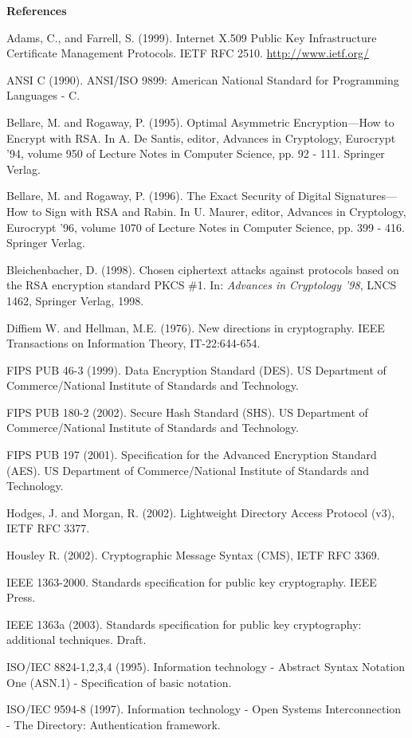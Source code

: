 \documentclass{article}
\begin{document}
\newpage
\noindent
{\Large\bf References}

Adams, C., and Farrell, S. (1999).
Internet X.509 Public Key Infrastructure
Certificate Management Protocols. IETF RFC 2510.
\url{http://www.ietf.org/}

ANSI C	(1990).  ANSI/ISO 9899: American National Standard for 
Programming Languages - C.

Bellare, M. and Rogaway, P. (1995). Optimal Asymmetric Encryption---How 
to Encrypt with RSA. In A. De Santis, editor, Advances in Cryptology, 
Eurocrypt '94, volume 950 of Lecture Notes in Computer Science, 
pp. 92 - 111. Springer Verlag.

Bellare, M. and Rogaway, P. (1996). The Exact Security of Digital 
Signatures---How to Sign with RSA and Rabin. In U. Maurer, editor, 
Advances in Cryptology,
Eurocrypt '96, volume 1070 of Lecture Notes in Computer Science, 
pp. 399 - 416. Springer Verlag.

Bleichenbacher, D. (1998).
Chosen ciphertext attacks against protocols based on the RSA encryption
standard PKCS \#1. In: {\em Advances in Cryptology '98}, LNCS 1462,
Springer Verlag, 1998.

Diffiem W. and Hellman, M.E. (1976).
New directions in cryptography. IEEE Transactions on Information Theory, 
IT-22:644-654.

FIPS PUB 46-3 (1999). Data Encryption Standard (DES).
US Department of Commerce/National Institute of Standards and Technology.

FIPS PUB 180-2 (2002). Secure Hash Standard (SHS).
US Department of Commerce/National Institute of Standards and Technology.

FIPS PUB 197 (2001). Specification for the Advanced Encryption Standard (AES).
US Department of Commerce/National Institute of Standards and Technology.

Hodges, J. and Morgan, R. (2002). 
Lightweight Directory Access Protocol (v3), IETF RFC 3377.

Housley R. (2002). Cryptographic Message Syntax (CMS), IETF RFC 3369.

IEEE 1363-2000. Standards specification for public key cryptography.
IEEE Press.

IEEE 1363a (2003). Standards specification for public key cryptography: 
additional techniques. Draft.

ISO/IEC 8824-1,2,3,4 (1995).
Information technology - Abstract Syntax Notation One (ASN.1) -
 Specification of basic notation.

ISO/IEC 9594-8 (1997). Information technology - Open Systems 
Interconnection - The Directory: Authentication framework.
\end{document}
